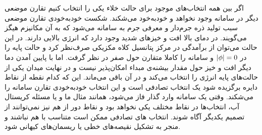 اگر بین همه انتخاب‌های موجود برای حالت خلاء یکی را انتخاب کنیم تقارن موضعی دیگر در سامانه وجود نخواهد و خودبه‌خود می‌شکند. شکست خودبه‌خودی تقارن موضعی سبب تولید ذره جرم‌دار و معرفی جرم به سامانه می‌شود  که به آن مکانیزم هیگز
می‌گویند.    
\cite{robinson2011symmetry , vilenkin2000cosmic}
در دمای بالا افت و خیزهای شدید وجود دارد که انرژی بالایی دارند. در این حالت می‌توان از برآمدگی در مرکز پتانسیل کلاه مکزیکی صرف‌نظر کرد و حالت پایه را در $\lvert\phi\rvert = 0$ و سامانه را کاملا متقارن حول صفر در نظر گرفت. اما با پایین آمدن دما دیگر افت و خیز حول مقدار بیشنه‌ی مبداء امکان‌پذیر نیست و در نهایت میدان یکی از حالت‌های پایه انرژی را انتخاب می‌کند و در آن باقی می‌ماند. این که کدام نقطه از نقاط دایره برگزیده شود یک انتخاب تصادفی است و این انتخاب خودبه‌خودی تقارن سامانه را می‌شکند. وقتی یک سامانه وارد گذار فاز می‌شود، همانند مثال ما و یا مسئله کریستال آب، انتخاب‌ها در نقاط مختلف یکی نخواهد بود و نقاط دور از هم نیز نمی‌توانند از تصمیم یکدیگر آگاه شوند. انتخاب های تصادفی ممکن است متناسب با هم نباشند و منجر به تشکیل نقیصه‌های خطی یا ریسمان‌های کیهانی شود.
\cite{davis2005fundamental , perivolaropoulos2005rise}           
